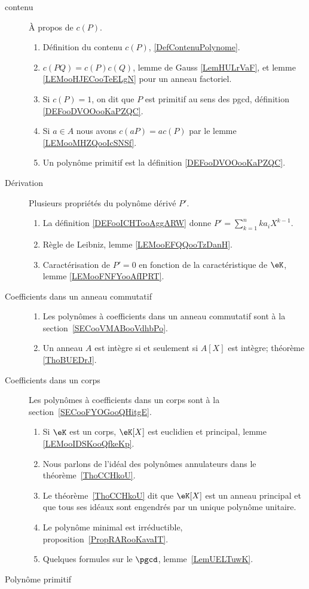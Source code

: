 \begin{description}
	\item[contenu]
		À propos de \( c(P)\).
		\begin{enumerate}
			\item
			      Définition du contenu \( c(P)\), \ref{DefContenuPolynome}.
			\item
			      \( c(PQ)=c(P)c(Q)\), lemme de Gauss \ref{LemHULrVaF}, et lemme \ref{LEMooHJECooTeELgN} pour un anneau factoriel.
			\item
			      Si \( c(P)=1\), on dit que \( P\) est primitif au sens des pgcd, définition \ref{DEFooDVOOooKaPZQC}.
			\item
			      Si \( a\in A\) nous avons \( c(aP)=ac(P)\) par le lemme \ref{LEMooMHZQooIcSNSf}.
			\item
			      Un polynôme primitif est la définition \ref{DEFooDVOOooKaPZQC}.
		\end{enumerate}

	\item[Dérivation]
		Plusieurs propriétés du polynôme dérivé \( P'\).
		\begin{enumerate}
			\item
			      La définition \ref{DEFooICHTooAggARW} donne \( P'=\sum_{k=1}^nka_iX^{k-1}\).
			\item
			      Règle de Leibniz, lemme \ref{LEMooEFQQooTzDanH}.
			\item
			      Caractérisation de \( P'=0\) en fonction de la caractéristique de \( \eK\), lemme \ref{LEMooFNFYooAfIPRT}.
		\end{enumerate}

	\item[Coefficients dans un anneau commutatif]

		\begin{enumerate}
			\item
			      Les polynômes à coefficients dans un anneau commutatif  sont à la section~\ref{SECooVMABooVdhbPo}.
			\item
			      Un anneau \( A\) est intègre si et seulement si \( A[X]\) est intègre; théorème \ref{ThoBUEDrJ}.
		\end{enumerate}


	\item[Coefficients dans un corps]
		Les polynômes à coefficients dans un corps sont à la section~\ref{SECooFYOGooQHitgE}.
		\begin{enumerate}
			\item
			      Si \( \eK\) est un corps, \( \eK[X]\) est euclidien et principal, lemme \ref{LEMooIDSKooQfkeKp}.
			\item
			      Nous parlons de l'idéal des polynômes annulateurs dans le théorème~\ref{ThoCCHkoU}.
			\item
			      Le théorème~\ref{ThoCCHkoU} dit que \( \eK[X]\) est un anneau principal et que tous ses idéaux sont engendrés par un unique polynôme unitaire.
			\item
			      Le polynôme minimal est irréductible, proposition~\ref{PropRARooKavaIT}.
			\item
			      Quelques formules sur le \( \pgcd\), lemme~\ref{LemUELTuwK}.
		\end{enumerate}
	\item[Polynôme primitif]


\end{description}
